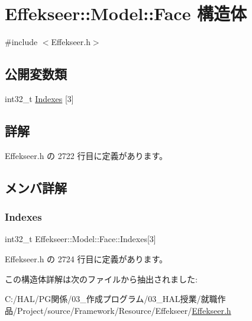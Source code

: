 \hypertarget{struct_effekseer_1_1_model_1_1_face}{}\section{Effekseer\+:\+:Model\+:\+:Face 構造体}
\label{struct_effekseer_1_1_model_1_1_face}


{\ttfamily \#include $<$Effekseer.\+h$>$}

\subsection*{公開変数類}
\begin{DoxyCompactItemize}
\item 
int32\+\_\+t \mbox{\hyperlink{struct_effekseer_1_1_model_1_1_face_aead573cd4f9b93d98f7181222eb5433c}{Indexes}} \mbox{[}3\mbox{]}
\end{DoxyCompactItemize}


\subsection{詳解}


 Effekseer.\+h の 2722 行目に定義があります。



\subsection{メンバ詳解}
\mbox{\label{struct_effekseer_1_1_model_1_1_face_aead573cd4f9b93d98f7181222eb5433c}} 
\subsubsection{\texorpdfstring{Indexes}{Indexes}}
{\footnotesize\ttfamily int32\+\_\+t Effekseer\+::\+Model\+::\+Face\+::\+Indexes\mbox{[}3\mbox{]}}



 Effekseer.\+h の 2724 行目に定義があります。



この構造体詳解は次のファイルから抽出されました\+:\begin{DoxyCompactItemize}
\item 
C\+:/\+H\+A\+L/\+P\+G関係/03\+\_\+作成プログラム/03\+\_\+\+H\+A\+L授業/就職作品/\+Project/source/\+Framework/\+Resource/\+Effekseer/\mbox{\hyperlink{_effekseer_8h}{Effekseer.\+h}}\end{DoxyCompactItemize}
